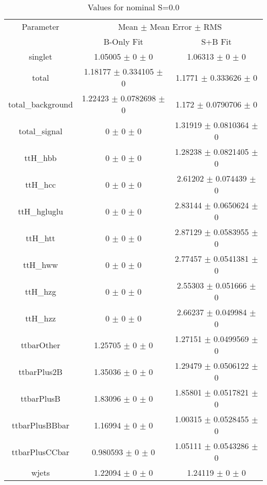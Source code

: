 \begin{table}
\centering
\caption{Values for nominal S=0.0}
\begin{tabular}{ccc}
\toprule
Parameter & \multicolumn{2}{c}{Mean $\pm$ Mean Error $\pm$ RMS}\\
 & B-Only Fit & S+B Fit\\
\midrule
singlet & \num{1.05005} $\pm$ \num{0} $\pm$ \num{0} & \num{1.06313} $\pm$ \num{0} $\pm$ \num{0}\\
total & \num{1.18177} $\pm$ \num{0.334105} $\pm$ \num{0} & \num{1.1771} $\pm$ \num{0.333626} $\pm$ \num{0}\\
total\_background & \num{1.22423} $\pm$ \num{0.0782698} $\pm$ \num{0} & \num{1.172} $\pm$ \num{0.0790706} $\pm$ \num{0}\\
total\_signal & \num{0} $\pm$ \num{0} $\pm$ \num{0} & \num{1.31919} $\pm$ \num{0.0810364} $\pm$ \num{0}\\
ttH\_hbb & \num{0} $\pm$ \num{0} $\pm$ \num{0} & \num{1.28238} $\pm$ \num{0.0821405} $\pm$ \num{0}\\
ttH\_hcc & \num{0} $\pm$ \num{0} $\pm$ \num{0} & \num{2.61202} $\pm$ \num{0.074439} $\pm$ \num{0}\\
ttH\_hgluglu & \num{0} $\pm$ \num{0} $\pm$ \num{0} & \num{2.83144} $\pm$ \num{0.0650624} $\pm$ \num{0}\\
ttH\_htt & \num{0} $\pm$ \num{0} $\pm$ \num{0} & \num{2.87129} $\pm$ \num{0.0583955} $\pm$ \num{0}\\
ttH\_hww & \num{0} $\pm$ \num{0} $\pm$ \num{0} & \num{2.77457} $\pm$ \num{0.0541381} $\pm$ \num{0}\\
ttH\_hzg & \num{0} $\pm$ \num{0} $\pm$ \num{0} & \num{2.55303} $\pm$ \num{0.051666} $\pm$ \num{0}\\
ttH\_hzz & \num{0} $\pm$ \num{0} $\pm$ \num{0} & \num{2.66237} $\pm$ \num{0.049984} $\pm$ \num{0}\\
ttbarOther & \num{1.25705} $\pm$ \num{0} $\pm$ \num{0} & \num{1.27151} $\pm$ \num{0.0499569} $\pm$ \num{0}\\
ttbarPlus2B & \num{1.35036} $\pm$ \num{0} $\pm$ \num{0} & \num{1.29479} $\pm$ \num{0.0506122} $\pm$ \num{0}\\
ttbarPlusB & \num{1.83096} $\pm$ \num{0} $\pm$ \num{0} & \num{1.85801} $\pm$ \num{0.0517821} $\pm$ \num{0}\\
ttbarPlusBBbar & \num{1.16994} $\pm$ \num{0} $\pm$ \num{0} & \num{1.00315} $\pm$ \num{0.0528455} $\pm$ \num{0}\\
ttbarPlusCCbar & \num{0.980593} $\pm$ \num{0} $\pm$ \num{0} & \num{1.05111} $\pm$ \num{0.0543286} $\pm$ \num{0}\\
wjets & \num{1.22094} $\pm$ \num{0} $\pm$ \num{0} & \num{1.24119} $\pm$ \num{0} $\pm$ \num{0}\\
\bottomrule
\end{tabular}
\end{table}